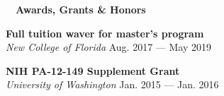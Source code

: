 \documentclass[a4paper,12pt]{article}
\newcommand{\resheading}[1]{{\hspace{-9pt} \colorbox{mygrey}{\begin{minipage}{\textwidth}{\textmd{~~\large \textbf{#1} \vphantom{p\^{E}}}}\end{minipage}}\vspace{6pt}} }
\newcommand{\ressubheading}[4]{{\begin{minipage}{\textwidth}
        \textbf{#1} \hfill #2 \\
        \textit{#3} \hfill #4 \\
        \end{minipage}}}
\begin{document}
        

        
        
\resheading{Awards, Grants \& Honors}
     \ressubheading{Full tuition waver for master's program}{}{New College of Florida}{Aug. 2017 ---  May 2019}
         
    \ressubheading{NIH PA-12-149 Supplement Grant}{}{University of Washington}{Jan. 2015 --- Jan. 2016}
\end{document}
